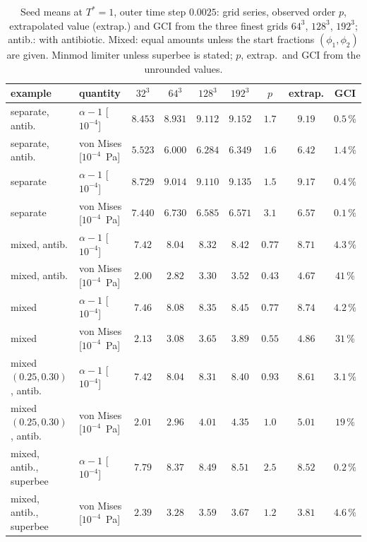 \begin{table}[htbp]
  \centering
  \caption[Grid convergence of growth and stress]{Seed means at $T^*=1$, outer time step $0.0025$: grid
    series, observed order $p$, extrapolated value (extrap.) and GCI from the three finest grids
    $64^3$, $128^3$, $192^3$; antib.: with antibiotic. Mixed: equal amounts unless the start
    fractions $(\phi_1,\phi_2)$ are given. Minmod limiter unless superbee is stated; $p$, extrap.\ and GCI from the
    unrounded values.}
  \label{tab:ch5-gci}
  \small
  \setlength{\tabcolsep}{2.4pt}
  \begin{tabular}{llccccccc}
    \toprule
    example & quantity & $32^3$ & $64^3$ & $128^3$ & $192^3$ & $p$ & extrap. & GCI \\
    \midrule
    separate, antib. & $\alpha-1$ [$10^{-4}$] & $8.453$ & $8.931$ & $9.112$ & $9.152$ & $1.7$ & $9.19$ & $0.5\,\%$ \\
    separate, antib. & von Mises [$10^{-4}$~Pa] & $5.523$ & $6.000$ & $6.284$ & $6.349$ & $1.6$ & $6.42$ & $1.4\,\%$ \\
    separate & $\alpha-1$ [$10^{-4}$] & $8.729$ & $9.014$ & $9.110$ & $9.135$ & $1.5$ & $9.17$ & $0.4\,\%$ \\
    separate & von Mises [$10^{-4}$~Pa] & $7.440$ & $6.730$ & $6.585$ & $6.571$ & $3.1$ & $6.57$ & $0.1\,\%$ \\
    mixed, antib. & $\alpha-1$ [$10^{-4}$] & $7.42$ & $8.04$ & $8.32$ & $8.42$ & $0.77$ & $8.71$ & $4.3\,\%$ \\
    mixed, antib. & von Mises [$10^{-4}$~Pa] & $2.00$ & $2.82$ & $3.30$ & $3.52$ & $0.43$ & $4.67$ & $41\,\%$ \\
    mixed & $\alpha-1$ [$10^{-4}$] & $7.46$ & $8.08$ & $8.35$ & $8.45$ & $0.77$ & $8.74$ & $4.2\,\%$ \\
    mixed & von Mises [$10^{-4}$~Pa] & $2.13$ & $3.08$ & $3.65$ & $3.89$ & $0.55$ & $4.86$ & $31\,\%$ \\
    mixed $(0.25,0.30)$, antib. & $\alpha-1$ [$10^{-4}$] & $7.42$ & $8.04$ & $8.31$ & $8.40$ & $0.93$ & $8.61$ & $3.1\,\%$ \\
    mixed $(0.25,0.30)$, antib. & von Mises [$10^{-4}$~Pa] & $2.01$ & $2.96$ & $4.01$ & $4.35$ & $1.0$ & $5.01$ & $19\,\%$ \\
    \midrule
    mixed, antib., superbee & $\alpha-1$ [$10^{-4}$] & $7.79$ & $8.37$ & $8.49$ & $8.51$ & $2.5$ & $8.52$ & $0.2\,\%$ \\
    mixed, antib., superbee & von Mises [$10^{-4}$~Pa] & $2.39$ & $3.28$ & $3.59$ & $3.67$ & $1.2$ & $3.81$ & $4.6\,\%$ \\
    \bottomrule
  \end{tabular}
\end{table}

